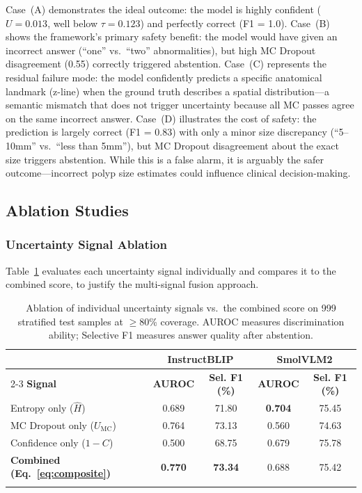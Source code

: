 \documentclass[pdflatex,sn-mathphys-num]{sn-jnl}
\begin{document}
Case~(A) demonstrates the ideal outcome: the model is highly confident ($U = 0.013$, well below $\tau = 0.123$) and perfectly correct (F1 = 1.0). Case~(B) shows the framework's primary safety benefit: the model would have given an incorrect answer (``one'' vs.\ ``two'' abnormalities), but high MC Dropout disagreement (0.55) correctly triggered abstention. Case~(C) represents the residual failure mode: the model confidently predicts a specific anatomical landmark (z-line) when the ground truth describes a spatial distribution---a semantic mismatch that does not trigger uncertainty because all MC passes agree on the same incorrect answer. Case~(D) illustrates the cost of safety: the prediction is largely correct (F1 = 0.83) with only a minor size discrepancy (``5--10mm'' vs.\ ``less than 5mm''), but MC Dropout disagreement about the exact size triggers abstention. While this is a false alarm, it is arguably the safer outcome---incorrect polyp size estimates could influence clinical decision-making.

\subsection{Ablation Studies}

\subsubsection{Uncertainty Signal Ablation}

Table~\ref{tab:signal_ablation} evaluates each uncertainty signal individually and compares it to the combined score, to justify the multi-signal fusion approach.

\begin{table}[t]
\caption{Ablation of individual uncertainty signals vs.\ the combined score on 999 stratified test samples at $\geq$80\% coverage. AUROC measures discrimination ability; Selective F1 measures answer quality after abstention.}\label{tab:signal_ablation}
\begin{tabular*}{\textwidth}{@{\extracolsep\fill}lcccc}
\toprule
& \multicolumn{2}{c}{\textbf{InstructBLIP}} & \multicolumn{2}{c}{\textbf{SmolVLM2}} \\
\cmidrule{2-3}\cmidrule{4-5}
\textbf{Signal} & \textbf{AUROC} & \textbf{Sel. F1 (\%)} & \textbf{AUROC} & \textbf{Sel. F1 (\%)} \\
\midrule
Entropy only ($\hat{H}$) & 0.689 & 71.80 & \textbf{0.704} & 75.45 \\
MC Dropout only ($U_{\text{MC}}$) & 0.764 & 73.13 & 0.560 & 74.63 \\
Confidence only ($1{-}C$) & 0.500 & 68.75 & 0.679 & 75.78 \\
\textbf{Combined (Eq.~\ref{eq:composite})} & \textbf{0.770} & \textbf{73.34} & 0.688 & 75.42 \\
\botrule
\end{tabular*}
\end{table}
\end{document}
